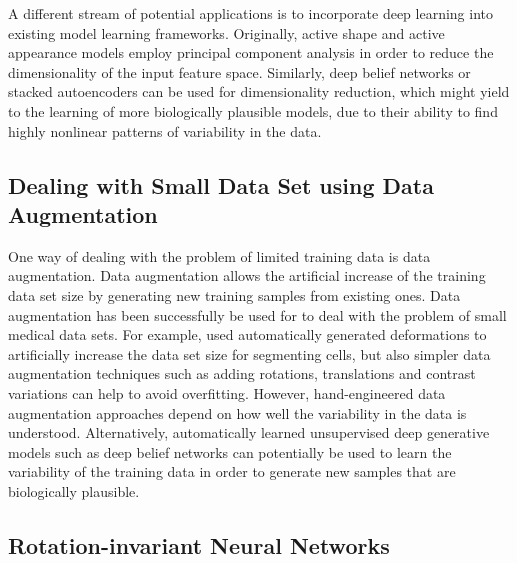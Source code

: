 A different stream of potential applications is to incorporate deep learning
into existing model learning frameworks. Originally, active shape
\cite{cootes1995} and active appearance \cite{cootes2001q} models employ
principal component analysis in order to reduce the dimensionality of the input
feature space. Similarly, deep belief networks or stacked autoencoders can be
used for dimensionality reduction, which might yield to the learning of more
biologically plausible models, due to their ability to find highly nonlinear
patterns of variability in the data.

\subsection{Dealing with Small Data Set using Data Augmentation}

One way of dealing with the problem of limited training data is data
augmentation. Data augmentation allows the artificial increase of the training
data set size by generating new training samples from existing ones. Data
augmentation has been successfully be used for to deal with the problem of small
medical data sets. For example, \citet{ronneberger2015} used automatically
generated deformations to artificially increase the data set size for segmenting
cells, but also simpler data augmentation techniques such as adding rotations,
translations and contrast variations can help to avoid overfitting. However,
hand-engineered data augmentation approaches depend on how well the variability
in the data is understood. Alternatively, automatically learned unsupervised
deep generative models such as deep belief networks can potentially be used to
learn the variability of the training data in order to generate new samples that
are biologically plausible.

\subsection{Rotation-invariant Neural Networks}


